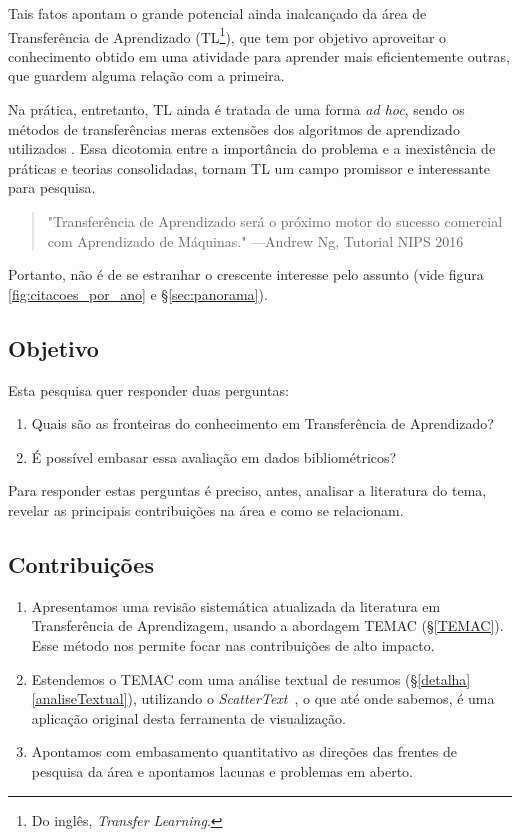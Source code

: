 \documentclass[sigconf]{acmart}
\begin{document}
  Tais fatos apontam  o grande potencial ainda inalcançado da área de Transferência de Aprendizado (TL\footnote{Do inglês, \emph{Transfer Learning}.}), que tem por objetivo aproveitar o conhecimento obtido em uma atividade para aprender mais eficientemente outras, que guardem alguma relação com a primeira.
  
  Na prática, entretanto, TL ainda é tratada de uma forma \textit{ad hoc}, sendo os métodos de transferências meras extensões dos algoritmos de aprendizado utilizados \cite{torrey}. Essa dicotomia entre a importância do problema e a inexistência de práticas e teorias consolidadas, tornam TL um campo promissor e interessante para pesquisa. 
  
  \begin{quote} "Transferência de Aprendizado será o próximo motor do sucesso comercial com Aprendizado de Máquinas." \hfill ---Andrew Ng, Tutorial NIPS 2016 \cite{ANg}
  \end{quote}

  Portanto, não é de se estranhar o crescente interesse pelo assunto (vide figura \ref{fig:citacoes_por_ano} e \S\ref{sec:panorama}).  

  \subsection{Objetivo}\label{objetivos}
   Esta pesquisa quer responder duas perguntas:
    \begin{enumerate}
      \item{Quais são as fronteiras do conhecimento em Transferência de Aprendizado?}
      \item {É possível embasar essa avaliação em dados bibliométricos?}
    \end{enumerate}
    Para responder estas perguntas é preciso, antes, analisar a literatura do tema, revelar as principais contribuições na área e como se relacionam.
  
  \subsection{Contribuições}

    \begin{enumerate}[C1.]
      \item Apresentamos uma revisão sistemática atualizada da literatura em Transferência de Aprendizagem, usando a abordagem TEMAC (\S \ref{TEMAC}). Esse método nos permite focar nas contribuições de alto impacto. 
      \item Estendemos o TEMAC com uma análise textual de resumos (\S \ref{detalha}\ref{analiseTextual}), utilizando o \emph{ScatterText}~\cite{kessler2017scattertext}, o que até onde sabemos, é uma aplicação original desta ferramenta de visualização.
      \item Apontamos com embasamento quantitativo as direções das frentes de pesquisa da área e apontamos lacunas e problemas em aberto.
    \end{enumerate}
  
\end{document}
